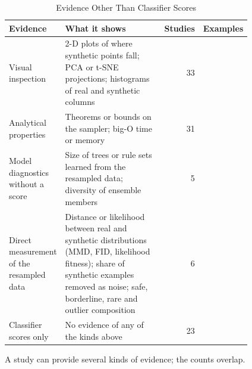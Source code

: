 \begin{table}[t]
  \caption{Evidence Other Than Classifier Scores}
  \label{tab:empirical-beyond}
  \footnotesize
  \setlength{\tabcolsep}{4pt}
  \begin{tabular}{@{}p{0.2\linewidth}p{0.44\linewidth}rp{0.17\linewidth}@{}}
    \toprule
    Evidence & What it shows & Studies & Examples\\
    \midrule
    Visual inspection & 2-D plots of where synthetic points fall; PCA or t-SNE projections; histograms of real and synthetic columns & 33 & \parencite{han2005borderline,liu2020mbs,kim2022sos}\\
    Analytical properties & Theorems or bounds on the sampler; big-O time or memory & 31 & \parencite{mullick2019gamo,abdi2016mdo,yadav2025ciso}\\
    Model diagnostics without a score & Size of trees or rule sets learned from the resampled data; diversity of ensemble members & 5 & \parencite{chawla2002smote,batista2004study,diezpastor2015randombalance}\\
    Direct measurement of the resampled data & Distance or likelihood between real and synthetic distributions (MMD, FID, likelihood fitness); share of synthetic examples removed as noise; safe, borderline, rare and outlier composition & 6 & \parencite{xu2019ctgan,saez2015smoteipf,liu2020spe}\\
    Classifier scores only & No evidence of any of the kinds above & 23 & \parencite{he2008adasyn,barua2014mwmote,maldonado2022fwsmote}\\
    \bottomrule
  \end{tabular}
  \par\smallskip\raggedright\scriptsize A study can provide several kinds of evidence; the counts overlap.
\end{table}
